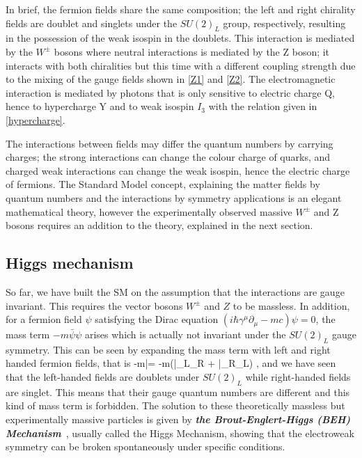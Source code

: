 In brief, the fermion fields share the same composition; the left and right chirality fields are doublet and singlets under the $SU(2)_L$ group, respectively, resulting in the possession of the weak isospin in the doublets. This interaction is mediated by the $W^\pm$ bosons where neutral interactions is mediated by the Z boson; it interacts with both chiralities but this time with a different coupling strength due to the mixing of the gauge fields shown in \autoref{Z1} and \autoref{Z2}. The electromagnetic interaction is mediated by photons that is only sensitive to electric charge Q, hence to hypercharge Y and to weak isospin $I_3$ with the relation given in \autoref{hypercharge}.

The interactions between fields may differ the quantum numbers by carrying charges; the strong interactions can change the colour charge of quarks, and charged weak interactions can change the weak isospin, hence the electric charge of fermions. The Standard Model concept, explaining the matter fields by quantum numbers and the interactions by symmetry applications is an elegant mathematical theory, however the experimentally observed massive $W^\pm$ and Z bosons requires an addition to the theory, explained in the next section.

\subsection{Higgs mechanism}\label{higgsmechanismsection}

So far, we have built the SM on the assumption that the interactions are gauge invariant. This requires the vector bosons $W^\pm$ and $Z$ to be massless. In addition, for a fermion field $\psi$ satisfying the Dirac equation $ (i\hbar\gamma^\mu\partial_\mu-mc)\psi = 0$, the mass term $-m\bar\psi\psi$ arises which is actually not invariant under the $SU(2)_L$ gauge symmetry. This can be seen by expanding the mass term with left and right handed fermion fields, that is
\be
-m\bar\psi\psi = -m\left(\bar\psi_L\psi_R + \bar\psi_R\psi_L\right) ,
\ee
and we have seen that the left-handed fields are doublets under $SU(2)_L$ while right-handed fields are singlet. This means that their gauge quantum numbers are different and this kind of mass term is forbidden. 
The solution to these theoretically massless but experimentally massive particles is given by \textbf{\emph{the Brout-Englert-Higgs (BEH) Mechanism}}~\cite{Higgs1964, BroutEnglert, Guralnik1964}, usually called the Higgs Mechanism, showing that the electroweak symmetry can be broken spontaneously under specific conditions. 

